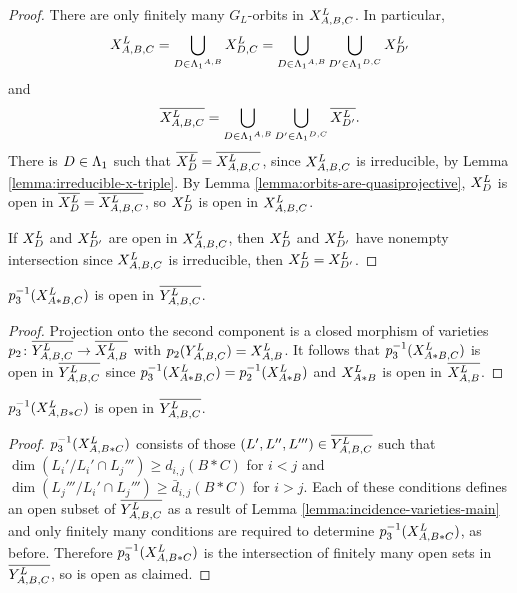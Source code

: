 \documentclass[a4paper, 11pt]{report}
\begin{document}
\begin{proof}
There are only finitely many $G_L$-orbits in $\xprod[L]{A,B,C}$. In particular,
\begin{equation*}
\xprod[L]{A,B,C}=\bigcup_{D\in\matrices^{A,B}}\xprod[L]{D,C}=\bigcup_{D\in\matrices^{A,B}}\bigcup_{D'\in\matrices^{D,C}}\xprod[L]{D'}
\end{equation*}
and
\begin{equation*}
\overline{\xprod[L]{A,B,C}} = \bigcup_{D\in\matrices^{A,B}}\bigcup_{D'\in\matrices^{D,C}}\overline{\xprod[L]{D'}}.
\end{equation*}
There is $D\in\matrices$ such that $\overline{\xprod[L]{D}}=\overline{\xprod[L]{A,B,C}}$, since $\xprod[L]{A,B,C}$ is irreducible, by Lemma \ref{lemma:irreducible-x-triple}. By Lemma \ref{lemma:orbits-are-quasiprojective}, $\xprod[L]{D}$ is open in $\overline{\xprod[L]{D}}=\overline{\xprod[L]{A,B,C}}$, so $\xprod[L]{D}$ is open in $\xprod[L]{A,B,C}$.

If $\xprod[L]{D}$ and $\xprod[L]{D'}$ are open in $\xprod[L]{A,B,C}$, then $\xprod[L]{D}$ and $\xprod[L]{D'}$ have nonempty intersection since $\xprod[L]{A,B,C}$ is irreducible, then $\xprod[L]{D}=\xprod[L]{D'}$.
\end{proof}

\begin{lemma}\label{lemma:yprod-generic-A-B}
$p_3^{-1}(\xprod[L]{A\ast B,C})$ is open in $\overline{\yprod[L]{A,B,C}}$.
\end{lemma}

\begin{proof}
Projection onto the second component is a closed morphism of varieties $p_2\colon\overline{\yprod[L]{A,B,C}}\to\overline{\xprod[L]{A,B}}$ with $p_2(\yprod[L]{A,B,C})=\xprod[L]{A,B}$. It follows that $p_3^{-1}(\xprod[L]{A\ast B,C})$ is open in $\overline{\yprod[L]{A,B,C}}$ since $p_3^{-1}(\xprod[L]{A\ast B,C})=p_2^{-1}(\xprod[L]{A\ast B})$ and $\xprod[L]{A\ast B}$ is open in $\overline{\xprod[L]{A,B}}$.
\end{proof}

\begin{lemma}\label{lemma:yprod-generic-B-C}
$p_3^{-1}(\xprod[L]{A,B\ast C})$ is open in $\overline{\yprod[L]{A,B,C}}$.
\end{lemma}

\begin{proof}
$p_3^{-1}(\xprod[L]{A,B\ast C})$ consists of those $(L',L'',L''')\in\overline{\yprod[L]{A,B,C}}$ such that $\dim\left(L_i'/{L_i'\cap L_j'''}\right)\geq d_{i,j}(B\ast C)$ for $i<j$ and $\dim\left(L_j'''/{L_i'\cap L_j'''}\right)\geq\bar{d}_{i,j}(B\ast C)$ for $i>j$. Each of these conditions defines an open subset of $\overline{\yprod[L]{A,B,C}}$ as a result of Lemma \ref{lemma:incidence-varieties-main} and only finitely many conditions are required to determine $p_3^{-1}(\xprod[L]{A,B\ast C})$, as before. Therefore $p_3^{-1}(\xprod[L]{A,B\ast C})$ is the intersection of finitely many open sets in $\overline{\yprod[L]{A,B,C}}$, so is open as claimed.
\end{proof}
\end{document}
